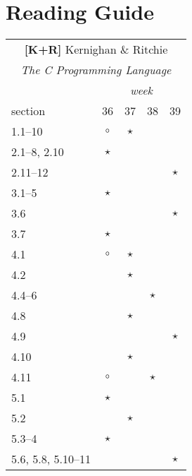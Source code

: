 \documentclass[a4paper]{article}
\newcommand{\refkr}{\textbf{[K+R]}\xspace}
\begin{document}
\section{Reading Guide}

\begin{table}
  \footnotesize
  \begin{minipage}[t]{0.5\columnwidth}
  \begin{tabular}{|l|c|c|c|c|}
    \hline
    \multicolumn{5}{|c|}{\refkr Kernighan \& Ritchie} \\
    \multicolumn{5}{|c|}{\emph{The C Programming Language}} \\
    \hline
                       & \multicolumn{4}{|c|}{\emph{week}} \\
    section            & 36      & 37      & 38      & 39 \\
    \hline
    1.1--10            & $\circ$ & $\star$ &         & \\
    \hline
    2.1--8, 2.10       & $\star$ &         &         & \\
    2.11--12           &         &         &         & $\star$ \\
    \hline
    3.1--5             & $\star$ &         &         & \\
    3.6                &         &         &         & $\star$ \\
    3.7                & $\star$ &         &         & \\
    \hline
    4.1                & $\circ$ & $\star$ &         & \\
    4.2                &         & $\star$ &         & \\
    4.4--6             &         &         & $\star$ & \\
    4.8                &         & $\star$ &         & \\
    4.9                &         &         &         & $\star$ \\
    4.10               &         & $\star$ &         & \\
    4.11               & $\circ$ &         & $\star$ & \\
    \hline
    5.1                & $\star$ &         &         & \\
    5.2                &         & $\star$ &         & \\
    5.3--4             & $\star$ &         &         & \\
    5.6, 5.8, 5.10--11 &         &         &         & $\star$ \\

\end{tabular}
\end{minipage}
\end{table}
\end{document}
